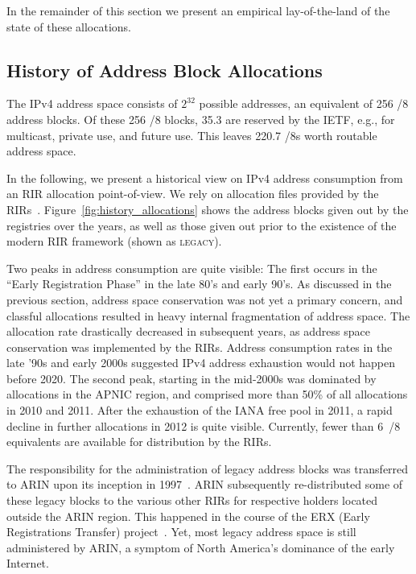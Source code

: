 \documentclass[letter]{sigcomm-alternate}
\begin{document}
In the remainder of this section we present an empirical lay-of-the-land
of the state of these allocations.

\subsection{History of Address Block Allocations}

The IPv4 address space consists of $2^{32}$ possible addresses, an equivalent
of 256 /8 address blocks. Of these 256 /8 blocks, 35.3 are reserved by the
IETF, e.g., for multicast, private use, and future use. This leaves
220.7 /8s worth routable address space.

In the following, we present a historical view on IPv4 address consumption 
from an RIR allocation point-of-view.  We rely on allocation files
provided by the RIRs~\cite{nro_files}. Figure~\ref{fig:history_allocations}
shows the address blocks given out by the registries over the years, as well as 
those given out prior to the existence of the modern RIR framework (shown as 
\textsc{legacy}).

Two peaks in address consumption are quite visible: The first 
occurs in the ``Early Registration Phase'' in the late 80's and early 90's. As
discussed in the previous section, address space conservation was not yet a
primary concern, and classful allocations resulted in heavy internal
fragmentation of address space.  The allocation rate drastically decreased in 
subsequent years, as address space conservation was implemented by the
RIRs. Address consumption rates in the late '90s and early 2000s suggested 
IPv4 address exhaustion would not happen  before 2020. The second peak, starting in 
the mid-2000s was dominated by allocations in the APNIC region, and comprised 
more than 50\% of all allocations in 2010 and 2011. After the 
exhaustion of the IANA free pool in 2011, a rapid decline in further allocations 
in 2012 is quite visible. Currently, fewer than 6~/8 equivalents are 
available for distribution by the RIRs.

The responsibility for the administration of legacy address blocks was 
transferred to ARIN upon its inception in 1997~\cite{nsi_arin_handover}. ARIN 
subsequently re-distributed some of these legacy blocks to the various other 
RIRs for respective holders located outside the ARIN region. This happened in 
the course of the ERX (Early Registrations Transfer) project~\cite{ripe_erx}. 
Yet, most legacy address space is still administered by ARIN, a symptom of North
America's dominance of the early Internet.
\end{document}
